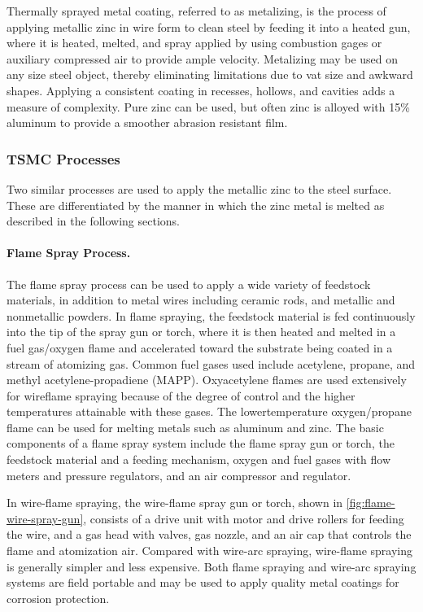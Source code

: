 Thermally sprayed metal coating, referred to as metalizing, is the process of applying metallic zinc in wire form
to clean steel by feeding it into a heated gun, where it is heated, melted, and spray applied by using combustion gages
or auxiliary compressed air to provide ample velocity. Metalizing may be used on any size steel object, thereby
eliminating limitations due to vat size and awkward shapes. Applying a consistent coating in recesses, hollows, and
cavities adds a measure of complexity. Pure zinc can be used, but often zinc is alloyed with 15\% aluminum to
provide a smoother abrasion resistant film.


\subsubsection{TSMC Processes}
Two similar processes are used to apply the metallic zinc to the steel surface. These are differentiated by the
manner in which the zinc metal is melted as described in the following sections.
\paragraph*{Flame Spray Process.}
The flame spray process can be used to apply a wide variety of feedstock materials, in addition to metal wires
including ceramic rods, and metallic and nonmetallic powders. In flame spraying, the feedstock material is fed
continuously into the tip of the spray gun or torch, where it is then heated and melted in a fuel gas/oxygen flame and
accelerated toward the substrate being coated in a stream of atomizing gas. Common fuel gases used include  acetylene, propane, and methyl acetylene-propadiene (MAPP). Oxyacetylene flames are used extensively for wireflame
spraying because of the degree of control and the higher temperatures attainable with these gases. The lowertemperature
oxygen/propane flame can be used for melting metals such as aluminum and zinc. The basic
components of a flame spray system include the flame spray gun or torch, the feedstock material and a feeding
mechanism, oxygen and fuel gases with flow meters and pressure regulators, and an air compressor and regulator.

In wire-flame spraying, the wire-flame spray gun or torch, shown in \cref{fig:flame-wire-spray-gun}, consists of a drive unit with
motor and drive rollers for feeding the wire, and a gas head with valves, gas nozzle, and an air cap that controls the
flame and atomization air. Compared with wire-arc spraying, wire-flame spraying is generally simpler and less
expensive. Both flame spraying and wire-arc spraying systems are field portable and may be used to apply quality
metal coatings for corrosion protection.

